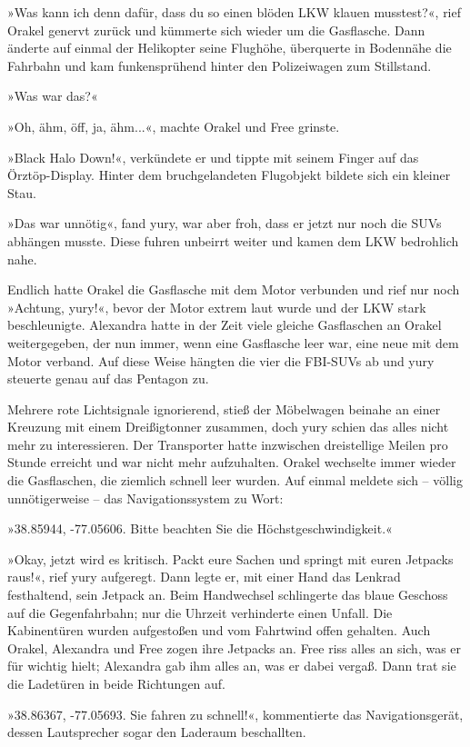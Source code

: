 »Was kann ich denn dafür, dass du so einen blöden LKW klauen musstest?«, rief Orakel genervt zurück und kümmerte sich wieder um die Gasflasche. Dann änderte auf einmal der Helikopter seine Flughöhe, überquerte in Bodennähe die Fahrbahn und kam funkensprühend hinter den Polizeiwagen zum Stillstand.

»Was war das?«

»Oh, ähm, öff, ja, ähm...«, machte Orakel und Free grinste.

»Black Halo Down!«, verkündete er und tippte mit seinem Finger auf das Örztöp-Display. Hinter dem bruchgelandeten Flugobjekt bildete sich ein kleiner Stau.

»Das war unnötig«, fand yury, war aber froh, dass er jetzt nur noch die SUVs abhängen musste. Diese fuhren unbeirrt weiter und kamen dem LKW bedrohlich nahe.

Endlich hatte Orakel die Gasflasche mit dem Motor verbunden und rief nur noch »Achtung, yury!«, bevor der Motor extrem laut wurde und der LKW stark beschleunigte. Alexandra hatte in der Zeit viele gleiche Gasflaschen an Orakel weitergegeben, der nun immer, wenn eine Gasflasche leer war, eine neue mit dem Motor verband. Auf diese Weise hängten die vier die FBI-SUVs ab und yury steuerte genau auf das Pentagon zu.

Mehrere rote Lichtsignale ignorierend, stieß der Möbelwagen beinahe an einer Kreuzung mit einem Dreißigtonner zusammen, doch yury schien das alles nicht mehr zu interessieren. Der Transporter hatte inzwischen dreistellige Meilen pro Stunde erreicht und war nicht mehr aufzuhalten. Orakel wechselte immer wieder die Gasflaschen, die ziemlich schnell leer wurden. Auf einmal meldete sich – völlig unnötigerweise – das Navigationssystem zu Wort:

»38.85944, -77.05606. Bitte beachten Sie die Höchstgeschwindigkeit.«

»Okay, jetzt wird es kritisch. Packt eure Sachen und springt mit euren Jetpacks raus!«, rief yury aufgeregt. Dann legte er, mit einer Hand das Lenkrad festhaltend, sein Jetpack an. Beim Handwechsel schlingerte das blaue Geschoss auf die Gegenfahrbahn; nur die Uhrzeit verhinderte einen Unfall. Die Kabinentüren wurden aufgestoßen und vom Fahrtwind offen gehalten. Auch Orakel, Alexandra und Free zogen ihre Jetpacks an. Free riss alles an sich, was er für wichtig hielt; Alexandra gab ihm alles an, was er dabei vergaß. Dann trat sie die Ladetüren in beide Richtungen auf.

»38.86367, -77.05693. Sie fahren zu schnell!«, kommentierte das Navigationsgerät, dessen Lautsprecher sogar den Laderaum beschallten.

